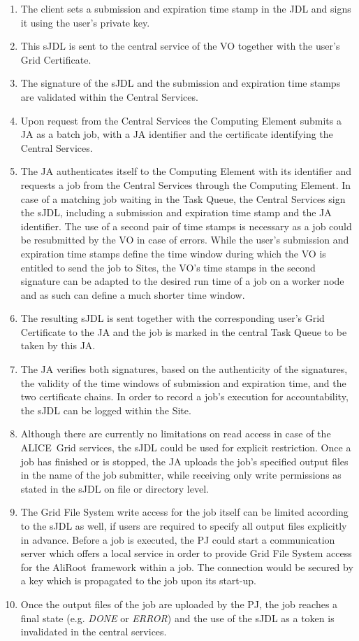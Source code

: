 \documentclass[10pt]{iopart}
\newcommand{\alice}{ALICE}
\newcommand{\aliroot}{AliRoot}
\begin{document}
\begin{enumerate}[{Step} 1{:}]
\item The client sets a submission and expiration time stamp in the JDL and
signs it using the user's private key.
\item This sJDL is sent to the central service of
the VO together with the user's Grid Certificate.
\item The signature of the sJDL and the submission and expiration time stamps
are validated within the Central Services.
\item Upon request from the Central Services
the Computing Element submits a JA as a batch job,
with a JA identifier and the certificate identifying the Central Services.
\item The JA authenticates itself to the Computing Element with its
identifier and requests a job from the Central Services through the Computing
Element. In case of a matching job waiting in the Task Queue, the Central
Services sign the sJDL, including a submission and expiration time stamp
and the JA identifier. The use of a second pair of time stamps is
necessary as a job could be resubmitted by the VO in case of errors.
While the user's submission and expiration time stamps define the
time window during which
the VO is entitled to send the job to Sites, the VO's time stamps
in the second signature can be adapted to the desired run time of a job on a
worker node and as such can define a much shorter time window. 
\item The resulting sJDL is sent together with the corresponding user's Grid
Certificate to the JA and the job
is marked in the central Task Queue to be taken by this JA.  
\item The JA verifies both signatures, based on the authenticity of the
signatures, the validity of the time windows of submission and
expiration time, and the two certificate chains. In order to record a job's 
execution for accountability, the sJDL can be logged within the Site.
\item Although there are currently no limitations on read access 
in case of the \alice\ Grid services, the sJDL could be used for 
explicit restriction. Once a job has finished or is stopped, the JA
uploads the job's specified output files in the name of the job submitter,
while receiving
only write permissions as stated in the sJDL on file or directory level.
\item The Grid File System write access for the job itself can be
limited according to the sJDL as well, if users are required to specify all
output files explicitly in advance. Before a job is executed, the PJ could start
a communication
server which offers a local service in order to
provide Grid File System access for the \aliroot\ framework within a job.
The connection would be secured by a key which is propagated to the job upon
its start-up.
\item Once the output files of the job are uploaded by the PJ,
the job reaches a final state (e.g. \textit{DONE} or
\textit{ERROR}) and the use of the sJDL as a token is invalidated in the
central services.
\end{enumerate}
\end{document}

